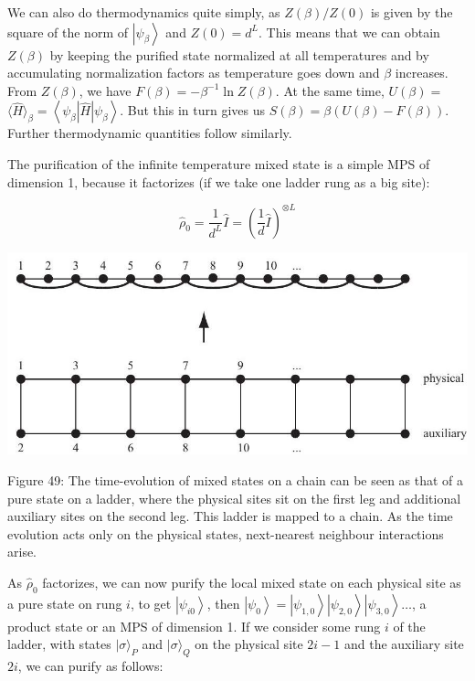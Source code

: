 \documentclass[12pt]{article}
\begin{document}
We can also do thermodynamics quite simply, as $Z(\beta) / Z(0)$ is given by the square of the norm of $\left|\psi_{\beta}\right\rangle$ and $Z(0)=d^{L}$. This means that we can obtain $Z(\beta)$ by keeping the purified state normalized at all temperatures and by accumulating normalization factors as temperature goes down and $\beta$ increases. From $Z(\beta)$, we have $F(\beta)=-\beta^{-1} \ln Z(\beta)$. At the same time, $U(\beta)=$ $\langle\hat{H}\rangle_{\beta}=\left\langle\psi_{\beta}|\hat{H}| \psi_{\beta}\right\rangle$. But this in turn gives us $S(\beta)=\beta(U(\beta)-F(\beta))$. Further thermodynamic quantities follow similarly.

The purification of the infinite temperature mixed state is a simple MPS of dimension 1, because it factorizes (if we take one ladder rung as a big site):


\begin{equation*}
\hat{\rho}_{0}=\frac{1}{d^{L}} \hat{I}=\left(\frac{1}{d} \hat{I}\right)^{\otimes L} \tag{241}
\end{equation*}


\begin{center}
\includegraphics[max width=\textwidth]{2024_05_04_afc4ad226da9ccfe0ac8g-080}
\end{center}

Figure 49: The time-evolution of mixed states on a chain can be seen as that of a pure state on a ladder, where the physical sites sit on the first leg and additional auxiliary sites on the second leg. This ladder is mapped to a chain. As the time evolution acts only on the physical states, next-nearest neighbour interactions arise.

As $\hat{\rho}_{0}$ factorizes, we can now purify the local mixed state on each physical site as a pure state on rung $i$, to get $\left|\psi_{i 0}\right\rangle$, then $\left|\psi_{0}\right\rangle=\left|\psi_{1,0}\right\rangle\left|\psi_{2,0}\right\rangle\left|\psi_{3,0}\right\rangle \ldots$, a product state or an MPS of dimension 1. If we consider some rung $i$ of the ladder, with states $|\sigma\rangle_{P}$ and $|\sigma\rangle_{Q}$ on the physical site $2 i-1$ and the auxiliary site $2 i$, we can purify as follows:
\end{document}
